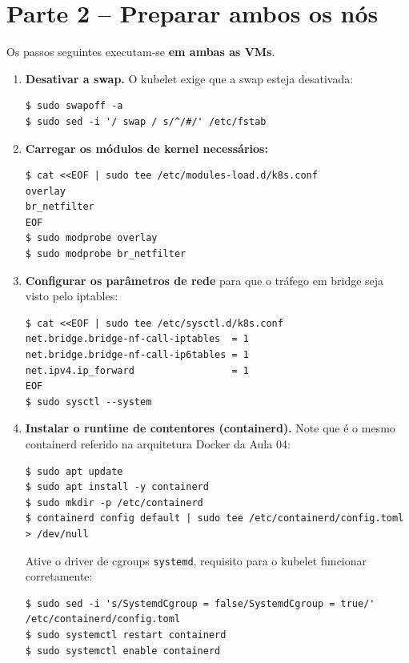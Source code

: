 \documentclass[11pt,a4paper]{article}
\begin{document}
\section{Parte 2 -- Preparar ambos os nós}
Os passos seguintes executam-se \textbf{em ambas as VMs}.

\begin{enumerate}[label=\arabic*.,resume]

  \item \textbf{Desativar a swap.} O kubelet exige que a swap esteja desativada:
\begin{lstlisting}
$ sudo swapoff -a
$ sudo sed -i '/ swap / s/^/#/' /etc/fstab
\end{lstlisting}

  \item \textbf{Carregar os módulos de kernel necessários:}
\begin{lstlisting}
$ cat <<EOF | sudo tee /etc/modules-load.d/k8s.conf
overlay
br_netfilter
EOF
$ sudo modprobe overlay
$ sudo modprobe br_netfilter
\end{lstlisting}

  \item \textbf{Configurar os parâmetros de rede} para que o tráfego em bridge seja visto pelo iptables:
\begin{lstlisting}
$ cat <<EOF | sudo tee /etc/sysctl.d/k8s.conf
net.bridge.bridge-nf-call-iptables  = 1
net.bridge.bridge-nf-call-ip6tables = 1
net.ipv4.ip_forward                 = 1
EOF
$ sudo sysctl --system
\end{lstlisting}

  \item \textbf{Instalar o runtime de contentores (containerd).} Note que é o mesmo containerd referido na arquitetura Docker da Aula 04:
\begin{lstlisting}
$ sudo apt update
$ sudo apt install -y containerd
$ sudo mkdir -p /etc/containerd
$ containerd config default | sudo tee /etc/containerd/config.toml > /dev/null
\end{lstlisting}
  Ative o driver de cgroups \texttt{systemd}, requisito para o kubelet funcionar corretamente:
\begin{lstlisting}
$ sudo sed -i 's/SystemdCgroup = false/SystemdCgroup = true/' /etc/containerd/config.toml
$ sudo systemctl restart containerd
$ sudo systemctl enable containerd
\end{lstlisting}


\end{enumerate}
\end{document}
